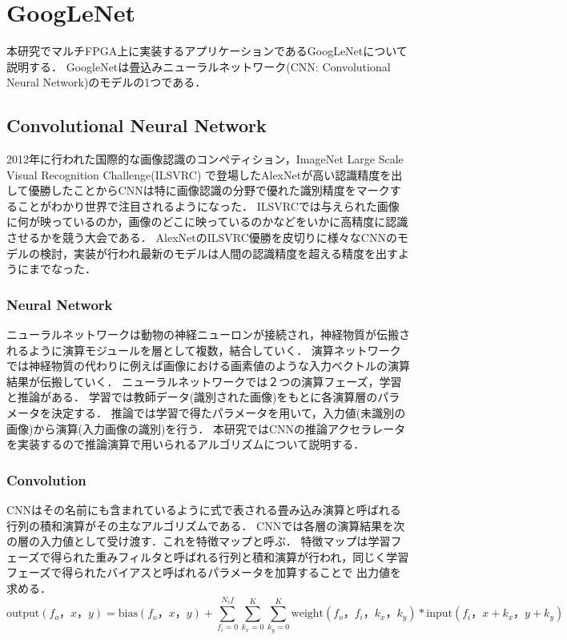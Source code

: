 \chapter{GoogLeNet}
{
\label{chap:googlenet}
本研究でマルチFPGA上に実装するアプリケーションであるGoogLeNet\cite{googlenet}について説明する．
GoogleNetは畳込みニューラルネットワーク(CNN: Convolutional Neural Network)のモデルの1つである．

\section{Convolutional Neural Network}
\label{sec:cnn}
2012年に行われた国際的な画像認識のコンペティション，ImageNet Large Scale Visual Recognition Challenge(ILSVRC)
で登場したAlexNet\cite{alexnet}が高い認識精度を出して優勝したことからCNNは特に画像認識の分野で優れた識別精度をマークすることがわかり世界で注目されるようになった．
ILSVRCでは与えられた画像に何が映っているのか，画像のどこに映っているのかなどをいかに高精度に認識させるかを競う大会である．
AlexNetのILSVRC優勝を皮切りに様々なCNNのモデルの検討，実装が行われ最新のモデルは人間の認識精度を超える精度を出すようにまでなった．

\subsection{Neural Network}
\label{sec:nn}
ニューラルネットワークは動物の神経ニューロンが接続され，神経物質が伝搬されるように演算モジュールを層として複数，結合していく．
演算ネットワークでは神経物質の代わりに例えば画像における画素値のような入力ベクトルの演算結果が伝搬していく．
ニューラルネットワークでは２つの演算フェーズ，学習と推論がある．
学習では教師データ(識別された画像)をもとに各演算層のパラメータを決定する．
推論では学習で得たパラメータを用いて，入力値(未識別の画像)から演算(入力画像の識別)を行う．
本研究ではCNNの推論アクセラレータを実装するので推論演算で用いられるアルゴリズムについて説明する．

\subsection{Convolution}
\label{sec:conv}
CNNはその名前にも含まれているように式で表される畳み込み演算と呼ばれる行列の積和演算がその主なアルゴリズムである．
CNNでは各層の演算結果を次の層の入力値として受け渡す．これを特徴マップと呼ぶ．
特徴マップは学習フェーズで得られた重みフィルタと呼ばれる行列と積和演算が行われ，同じく学習フェーズで得られたバイアスと呼ばれるパラメータを加算することで
出力値を求める．
\begin{equation}
  \label{eq:conv}
	\mathrm{output}(f_o， x， y) = \mathrm{bias}(f_o， x， y) + \sum_{f_i = 0}^{N_if}\sum_{k_x = 0}^{K}\sum_{k_y = 0}^{K}\mathrm{weight}(f_o， f_i，k_x，k_y) * \mathrm{input}(f_i，x + k_x， y + k_y)
\end{equation}

}

